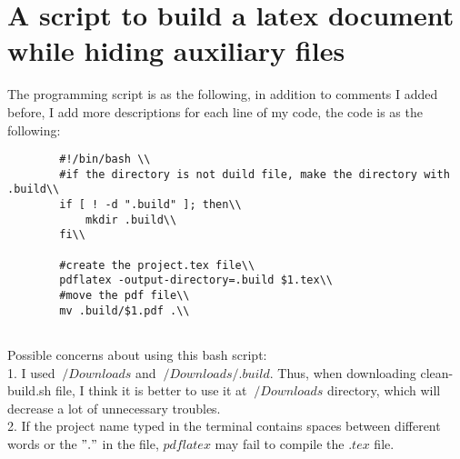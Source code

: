 \documentclass{article}
\begin{document}
\section{A script to build a latex document while hiding auxiliary files}
The programming script is as the following, in addition to comments I added before, I add more descriptions for each line of my code, the code is as the following:
\begin{lstlisting}
        #!/bin/bash \\
        #if the directory is not duild file, make the directory with .build\\
        if [ ! -d ".build" ]; then\\
            mkdir .build\\
        fi\\

        #create the project.tex file\\
        pdflatex -output-directory=.build $1.tex\\
        #move the pdf file\\
        mv .build/$1.pdf .\\


\end{lstlisting}
Possible concerns about using this bash script:\\
1. I used $~/Downloads$ and $~/Downloads/.build$. Thus, when downloading clean-build.sh file, I think it is better to use it at $~/Downloads$ directory, which will decrease a lot of unnecessary troubles.\\
2. If the project name typed in the terminal contains spaces between different words or the $"."$ in the file, $pdflatex$ may fail to compile the $.tex$ file. \\
\end{document}
